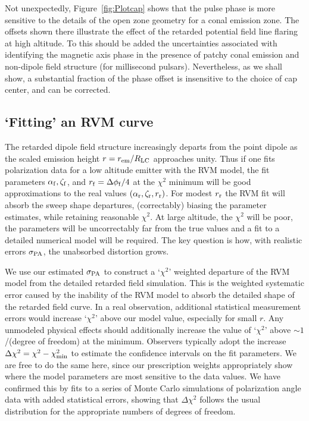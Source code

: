 	Not unexpectedly, Figure~\ref{fig:Plotcap} shows that the pulse phase is 
more sensitive to the details of the open zone geometry for a conal emission zone.
The offsets shown there illustrate the effect of the retarded potential field
line flaring at high altitude. To this should be added the uncertainties associated 
with identifying the magnetic axis phase in the presence of patchy conal emission and
non-dipole field structure (for millisecond pulsars). Nevertheless, as we shall show, a substantial
fraction of the phase offset is insensitive to the choice of cap center, and can
be corrected.

\subsection{`Fitting' an RVM curve}

The retarded dipole field structure increasingly departs from the point dipole
as the scaled emission height $r=r_{\rm{em}}/R_{\rm{LC}}$ approaches unity. Thus
if one fits polarization data for a low altitude emitter with the RVM model, the 
fit parameters $\alpha_{\rm{f}},\zeta_{\rm{f}}$, and $r_{\rm{f}} = \Delta \phi_{\rm{f}}/4$ at the $\chi^{2}$ minimum will be
good approximations to the real values $(\alpha_{\rm{r}}, \zeta_{\rm{r}}, r_{\rm{r}})$. For modest $r_{\rm{r}}$
the RVM fit will absorb the sweep shape departures, (correctably) biasing the
parameter estimates, while retaining reasonable $\chi^{2}$. At large altitude, the
$\chi^{2}$ will be poor, the parameters will be uncorrectably far from the true
values and a fit to a detailed numerical model will be required. The key question
is how, with realistic errors $\sigma_{\rm{PA}}$, the unabsorbed distortion grows.

	We use our estimated $\sigma_{\rm{PA}}$ to construct a `$\chi^2$' weighted 
departure of the RVM model from the detailed retarded field simulation. This is the
weighted systematic error caused by the inability of the RVM model to absorb
the detailed shape of the retarded field curve. In a real observation, additional
statistical measurement errors would increase `$\chi^2$' above our model value,
especially for small $r$. Any unmodeled physical effects should additionally increase
the value of `$\chi^2$' above $\sim 1$/(degree of freedom) at the minimum.
Observers typically adopt the increase $\Delta \chi^2=\chi^2-\chi_{\rm{min}}^2$ to
estimate the confidence intervals on the fit parameters. We are free to do the 
same here, since our prescription weights appropriately show where the model 
parameters are most sensitive to the data values.  We have confirmed this by 
fits to a series of Monte Carlo simulations of polarization angle data with added statistical errors,
showing that $\Delta \chi^2$ follows the usual distribution for the appropriate 
numbers of degrees of freedom. 

